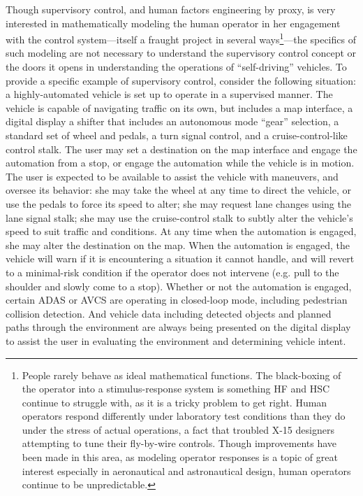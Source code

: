 Though supervisory control, and human factors engineering by proxy, is
very interested in mathematically modeling the human operator in her
engagement with the control system---itself a fraught project in
several ways\footnote{People rarely behave as ideal mathematical
  functions. The black-boxing of the operator into a stimulus-response
system is something HF and HSC continue to struggle with, as it is a
tricky problem to get right. Human operators respond differently under
laboratory test conditions than they do under the stress of actual
operations, a fact that troubled X-15 designers attempting to tune
their fly-by-wire controls.\cite[p. ???]{???-digitalApollo} Though
improvements have been made in this area, as modeling operator
responses is a topic of great interest especially in aeronautical and
astronautical design, human operators continue to be
unpredictable.}---the specifics of such modeling are not necessary to
understand the supervisory control concept or the doors it opens in
understanding the operations of ``self-driving'' vehicles. To provide
a specific example of supervisory control, consider the following
situation: a highly-automated vehicle is set up to operate in a
supervised manner. The vehicle is capable of navigating traffic on its
own, but includes a map interface, a digital display a shifter that includes an
autonomous mode ``gear'' selection, a standard set of wheel and
pedals, a turn signal control,
and a cruise-control-like control stalk. The user may set a
destination on the map interface and engage the automation from a stop, or engage
the automation while the vehicle is in motion. The user is expected to
be available to assist the vehicle with maneuvers, and oversee its
behavior:  she may take the wheel at any time to direct the vehicle,
or use the pedals to force its speed to alter; she may request lane
changes using the lane signal stalk; she may use the cruise-control
stalk to subtly alter the vehicle's speed to suit traffic and
conditions. At any time when the automation is engaged, she may alter
the destination on the map. When the automation is engaged, the
vehicle will warn if it is encountering a situation it cannot handle,
and will revert to a minimal-risk condition if the operator does not
intervene (e.g. pull to the shoulder and slowly come to a stop).
Whether or not the automation is engaged,
certain ADAS or AVCS are operating in closed-loop mode, including
pedestrian collision detection. And vehicle data including detected
objects and planned paths through the environment are always being
presented on the digital display to assist the user in evaluating the
environment and determining vehicle intent.

